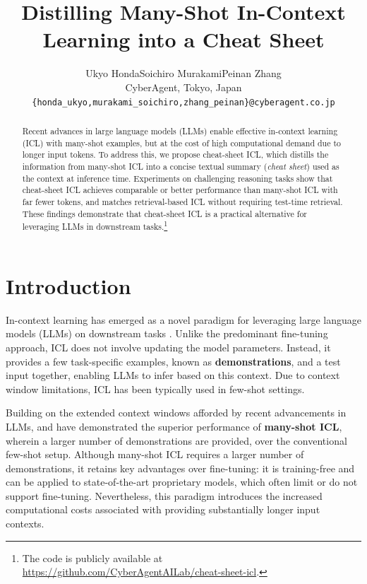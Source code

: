 \documentclass[11pt]{article}
\title{Distilling Many-Shot In-Context Learning into a Cheat Sheet}
\author{
  Ukyo Honda\qquad Soichiro Murakami\qquad Peinan Zhang\\
  CyberAgent, Tokyo, Japan\\
  \texttt{\{honda\_ukyo,murakami\_soichiro,zhang\_peinan\}@cyberagent.co.jp}
}
\begin{document}
\maketitle
\begin{abstract}
Recent advances in large language models (LLMs) enable effective in-context learning (ICL) with many-shot examples, but at the cost of high computational demand due to longer input tokens.
To address this, we propose cheat-sheet ICL, which distills the information from many-shot ICL into a concise textual summary (\emph{cheat sheet}) used as the context at inference time.
Experiments on challenging reasoning tasks show that cheat-sheet ICL achieves comparable or better performance than many-shot ICL with far fewer tokens, and matches retrieval-based ICL without requiring test-time retrieval.
These findings demonstrate that cheat-sheet ICL is a practical alternative for leveraging LLMs in downstream tasks.\footnote{The code is publicly available at \url{https://github.com/CyberAgentAILab/cheat-sheet-icl}.}
\end{abstract}


\section{Introduction}
\label{sec:intro}

In-context learning \citep[ICL;][]{brown2020language} has emerged as a novel paradigm for leveraging large language models (LLMs) on downstream tasks \citep{dong-etal-2024-survey}.
Unlike the predominant fine-tuning approach, ICL does not involve updating the model parameters.
Instead, it provides a few task-specific examples, known as \textbf{demonstrations}, and a test input together, enabling LLMs to infer based on this context.
Due to context window limitations, ICL has been typically used in few-shot settings.

Building on the extended context windows afforded by recent advancements in LLMs, \citet{agarwal2024manyshot} and \citet{bertsch-etal-2025-context} have demonstrated the superior performance of \textbf{many-shot ICL}, wherein a larger number of demonstrations are provided, over the conventional few-shot setup.
Although many-shot ICL requires a larger number of demonstrations, it retains key advantages over fine-tuning: it is training-free and can be applied to state-of-the-art proprietary models, which often limit or do not support fine-tuning.
Nevertheless, this paradigm introduces the increased computational costs associated with providing substantially longer input contexts.
\end{document}

